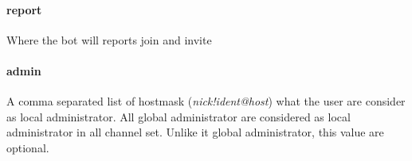 \documentclass[a4paper,12pt,titlepage]{article}
\begin{document}
\paragraph{report} Where the bot will reports  join and invite
\paragraph{admin} A comma separated list of hostmask (\textit{nick!ident@host}) what the user are consider as local administrator. All global administrator are considered as local administrator in all channel set. Unlike it global administrator, this value are optional.
\end{document}
